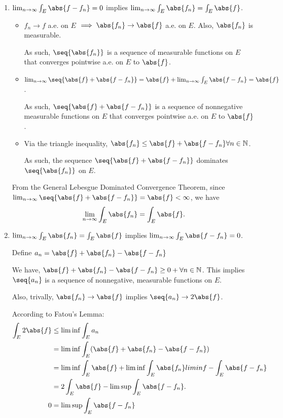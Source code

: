 \begin{enumerate}[label=(\roman*)]
    \item $\lim_{n\to\infty} \int_E \abs{f - f_n} = 0$ implies $\lim_{n\to\infty} \int_E \abs{f_n} = \int_E \abs{f}$.
    
    \begin{itemize}
        \item $f_n \to f$ a.e. on $E$ $\implies \abs{f_n} \to \abs{f}$ a.e. on $E$. Also, $\abs{f_n}$ is measurable.
        
        As such, $\seq{\abs{f_n}}$ is a sequence of             measurable functions on $E$ that converges pointwise a.e. on $E$ to $\abs{f}$.

        \item $\lim_{n\to\infty}\seq{\abs{f} + \abs{f - f_n}} = \abs{f} + \lim_{n\to\infty} \int_E \abs{f - f_n} = \abs{f}$.
        
        As such, $\seq{\abs{f} + \abs{f - f_n}}$ is a sequence of nonnegative measurable functions on $E$ that converges pointwise a.e. on $E$ to $\abs{f}$.

        \item Via the triangle inequality, $\abs{f_n} \leq \abs{f} + \abs{f-f_n} \forall n\in\N$. 
        
        As such, the sequence $\seq{\abs{f} + \abs{f - f_n}}$ dominates $\seq{\abs{f_n}}$ on $E$.
    \end{itemize}

    From the General Lebesgue Dominated Convergence Theorem, since $\lim_{n\to\infty}\seq{\abs{f} + \abs{f - f_n}}= \abs{f} < \infty$, we have
    \[\lim_{n\to\infty} \int_E \abs{f_n} = \int_E \abs{f}.\]

    
    \item $\lim_{n\to\infty} \int_E \abs{f_n} = \int_E \abs{f}$ implies $\lim_{n\to\infty} \int_E \abs{f - f_n} = 0$.
    
    Define $a_n = \abs{f} + \abs{f_n} - \abs{f-f_n}$
    
    We have, $\abs{f} + \abs{f_n} - \abs{f-f_n} \geq 0 + \forall n\in\N$.
    This implies $\seq{a_n}$ is a sequence of nonnegative, measurable functions on $E$.

    Also, trivally, $\abs{f_n} \to \abs{f}$ implies $\seq{a_n} \to 2\abs{f}$.

    According to Fatou's Lemma:
    \begin{align*}
        \int_E 2\abs{f} &\leq \liminf \int_E a_n
        \\&= \liminf \int_E (\abs{f} + \abs{f_n} - \abs{f-f_n})
        \\&= \liminf \int_E \abs{f} + \liminf \int_E \abs{f_n} liminf - \int_E \abs{f-f_n}
        \\&= 2 \int_E \abs{f} - \limsup \int_E \abs{f-f_n}.
        \\ 0 &= \limsup \int_E \abs{f - f_n}
    \end{align*}
    

\end{enumerate}
